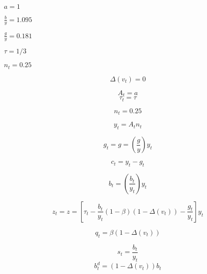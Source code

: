 \documentclass{article}
\begin{document}
$a=1$

$\frac{b}{y}=1.095$

$\frac{g}{y}=0.181$

$\tau =1/3$

$n_{t}=0.25$

\[
\Delta \left( v_{t}\right) =0
\]

\begin{equation}
A_{t}=a
\end{equation}%
\begin{equation}
\tau _{t}=\tau 
\end{equation}

\begin{equation}
n_{t}=0.25
\end{equation}

\begin{equation}
y_{t}=A_{t}n_{t}
\end{equation}

\begin{equation}
g_{t}=g=\left( \frac{g}{y}\right) y_{t}
\end{equation}

\begin{equation}
c_{t}=y_{t}-g_{t}
\end{equation}

\begin{equation}
b_{t}=\left( \frac{b_{t}}{y_{t}}\right) y_{t}
\end{equation}

\begin{equation}
z_{t}=z=\left[ \tau _{t}-\frac{b_{t}}{y_{t}}\left( 1-\beta \right) \left(
1-\Delta \left( v_{t}\right) \right) -\frac{g_{t}}{y_{t}}\right] y_{t}
\end{equation}

\begin{equation}
q_{t}=\beta \left( 1-\Delta \left( v_{t}\right) \right) 
\end{equation}

\begin{equation}
s_{t}=\frac{b_{t}}{y_{t}}
\end{equation}%
\begin{equation}
b_{t}^{d}=\left( 1-\Delta \left( v_{t}\right) \right) b_{t}
\end{equation}
\end{document}

